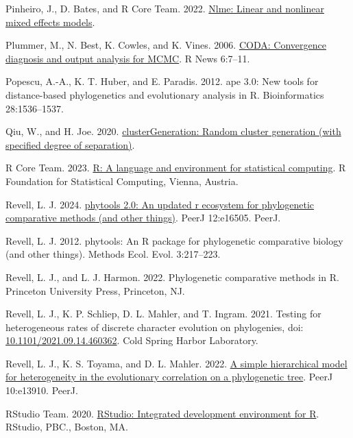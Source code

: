 \documentclass[fleqn,10pt,lineno]{wlpeerj} %
\newlength{\cslhangindent}
\newenvironment{CSLReferences}[2] %
 {\begin{list}{}{%
  \setlength{\itemindent}{0pt}
  \setlength{\leftmargin}{0pt}
  \setlength{\parsep}{0pt}
  \ifodd #1
   \setlength{\leftmargin}{\cslhangindent}
   \setlength{\itemindent}{-1\cslhangindent}
  \fi
  \setlength{\itemsep}{#2\baselineskip}}}
 {\end{list}}
\begin{document}
\begin{CSLReferences}{1}{0}
Pinheiro, J., D. Bates, and R Core Team. 2022. \href{https://CRAN.R-project.org/package=nlme}{Nlme: Linear and nonlinear mixed effects models}.

Plummer, M., N. Best, K. Cowles, and K. Vines. 2006. \href{https://journal.r-project.org/archive/}{CODA: Convergence diagnosis and output analysis for MCMC}. R News 6:7--11.

Popescu, A.-A., K. T. Huber, and E. Paradis. 2012. {ape} 3.0: New tools for distance-based phylogenetics and evolutionary analysis in {R}. Bioinformatics 28:1536--1537.

Qiu, W., and H. Joe. 2020. \href{https://CRAN.R-project.org/package=clusterGeneration}{clusterGeneration: Random cluster generation (with specified degree of separation)}.

R Core Team. 2023. \href{https://www.R-project.org/}{R: A language and environment for statistical computing}. R Foundation for Statistical Computing, Vienna, Austria.

Revell, L. J. 2024. \href{https://doi.org/10.7717/peerj.16505}{{phytools} 2.0: An updated r ecosystem for phylogenetic comparative methods (and other things)}. PeerJ 12:e16505. PeerJ.

Revell, L. J. 2012. {phytools}: An {R} package for phylogenetic comparative biology (and other things). Methods Ecol. Evol. 3:217--223.

Revell, L. J., and L. J. Harmon. 2022. Phylogenetic comparative methods in {R}. Princeton University Press, Princeton, NJ.

Revell, L. J., K. P. Schliep, D. L. Mahler, and T. Ingram. 2021. Testing for heterogeneous rates of discrete character evolution on phylogenies, doi: \href{https://doi.org/10.1101/2021.09.14.460362}{10.1101/2021.09.14.460362}. Cold Spring Harbor Laboratory.

Revell, L. J., K. S. Toyama, and D. L. Mahler. 2022. \href{https://doi.org/10.7717/peerj.13910}{A simple hierarchical model for heterogeneity in the evolutionary correlation on a phylogenetic tree}. PeerJ 10:e13910. PeerJ.

RStudio Team. 2020. \href{http://www.rstudio.com/}{R{S}tudio: Integrated development environment for {R}}. RStudio, PBC., Boston, MA.


\end{CSLReferences}
\end{document}
